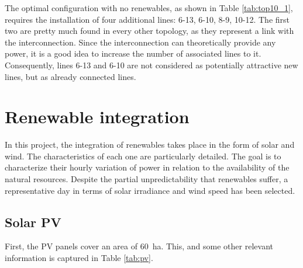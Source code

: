The optimal configuration with no renewables, as shown in Table \ref{tab:top10_1}, requires the installation of four additional lines: 6-13, 6-10, 8-9, 10-12. The first two are pretty much found in every other topology, as they represent a link with the interconnection. Since the interconnection can theoretically provide any power, it is a good idea to increase the number of associated lines to it. Consequently, lines 6-13 and 6-10 are not considered as potentially attractive new lines, but as already connected lines.



\section{Renewable integration}
In this project, the integration of renewables takes place in the form of solar and wind. The characteristics of each one are particularly detailed. The goal is to characterize their hourly variation of power in relation to the availability of the natural resources. Despite the partial unpredictability that renewables suffer, a representative day in terms of solar irradiance and wind speed has been selected. 

\subsection{Solar PV}
First, the PV panels cover an area of 60~ha. This, and some other relevant information is captured in Table \ref{tab:pv}. 


